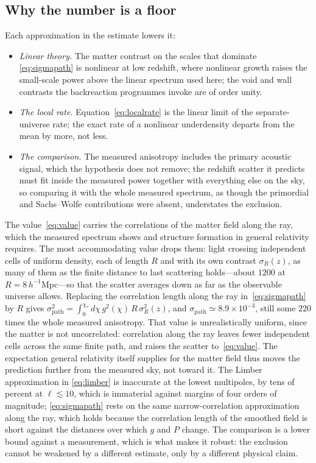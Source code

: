 \documentclass[aps,prd,reprint,amsmath,amssymb,superscriptaddress]{revtex4-2}
\begin{document}
\subsection{Why the number is a floor}

Each approximation in the estimate lowers it:
\begin{itemize}
\item \emph{Linear theory.} The matter contrast on the scales that dominate \eqref{eq:sigmapath} is nonlinear at low redshift, where nonlinear growth raises the small-scale power above the linear spectrum used here; the void and wall contrasts the backreaction programmes invoke are of order unity.
\item \emph{The local rate.} Equation~\eqref{eq:localrate} is the linear limit of the separate-universe rate; the exact rate of a nonlinear underdensity departs from the mean by more, not less.
\item \emph{The comparison.} The measured anisotropy includes the primary acoustic signal, which the hypothesis does not remove; the redshift scatter it predicts must fit inside the measured power together with everything else on the sky, so comparing it with the whole measured spectrum, as though the primordial and Sachs--Wolfe contributions were absent, understates the exclusion.
\end{itemize}
The value~\eqref{eq:value} carries the correlations of the matter field along the ray, which the measured spectrum shows and structure formation in general relativity requires. The most accommodating value drops them: light crossing independent cells of uniform density, each of length $R$ and with its own contrast $\sigma_R(z)$, as many of them as the finite distance to last scattering holds---about $1200$ at $R=8\,h^{-1}$Mpc---so that the scatter averages down as far as the observable universe allows. Replacing the correlation length along the ray in~\eqref{eq:sigmapath} by $R$ gives $\sigma^{2}_{\mathrm{path}}=\int_0^{\chi_*}d\chi\,g^{2}(\chi)\,R\,\sigma_R^{2}(z)$, and $\sigma_{\mathrm{path}}\simeq8.9\times10^{-3}$, still some $220$ times the whole measured anisotropy. That value is unrealistically uniform, since the matter is not uncorrelated: correlation along the ray leaves fewer independent cells across the same finite path, and raises the scatter to~\eqref{eq:value}. The expectation general relativity itself supplies for the matter field thus moves the prediction further from the measured sky, not toward it. The Limber approximation in \eqref{eq:limber} is inaccurate at the lowest multipoles, by tens of percent at $\ell\lesssim10$, which is immaterial against margins of four orders of magnitude; \eqref{eq:sigmapath} rests on the same narrow-correlation approximation along the ray, which holds because the correlation length of the smoothed field is short against the distances over which $g$ and $P$ change. The comparison is a lower bound against a measurement, which is what makes it robust: the exclusion cannot be weakened by a different estimate, only by a different physical claim.
\end{document}
